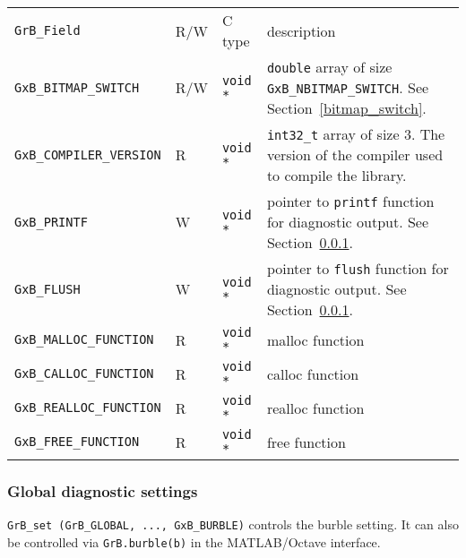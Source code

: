 \vspace{0.1in}
\noindent
{\small
\begin{tabular}{|l|l|l|p{2.5in}|}
\hline
\verb'GrB_Field'                    & R/W  & C type        & description \\
\verb'GxB_BITMAP_SWITCH'            & R/W  & \verb'void *' & \verb'double' array of size \newline
                                                                \verb'GxB_NBITMAP_SWITCH'.  \newline
                                                                See Section~\ref{bitmap_switch}. \\
\verb'GxB_COMPILER_VERSION'         & R    & \verb'void *' & \verb'int32_t' array of size 3.
                                        The version of the compiler used to
                                        compile the library. \\
\verb'GxB_PRINTF'                   & W    & \verb'void *' & pointer to \verb'printf' function for diagnostic output.
                                                                See Section~\ref{diag}. \\
\verb'GxB_FLUSH'                    & W    & \verb'void *' & pointer to \verb'flush' function for diagnostic output.
                                                                See Section~\ref{diag}. \\
\verb'GxB_MALLOC_FUNCTION'  & R    & \verb'void *' & malloc function \\
\verb'GxB_CALLOC_FUNCTION'  & R    & \verb'void *' & calloc function \\
\verb'GxB_REALLOC_FUNCTION' & R    & \verb'void *' & realloc function \\
\verb'GxB_FREE_FUNCTION'    & R    & \verb'void *' & free function \\
\hline
\end{tabular}
}

\subsubsection{Global diagnostic settings}
\label{diag}

\verb'GrB_set (GrB_GLOBAL, ..., GxB_BURBLE)' controls the burble setting.  It can also be
controlled via \verb'GrB.burble(b)' in the MATLAB/Octave interface.

